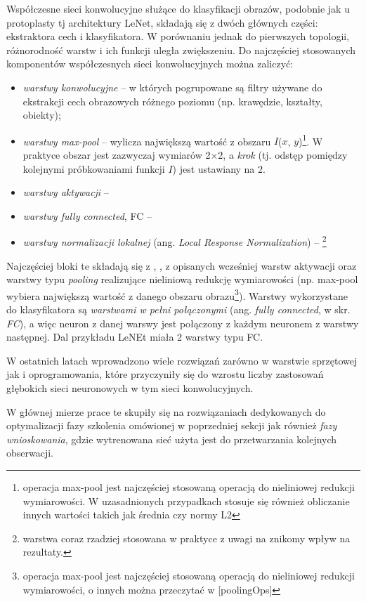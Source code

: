 Współczesne sieci konwolucyjne służące do klasyfikacji obrazów, podobnie jak u protoplasty tj architektury LeNet, składają się z dwóch głównych części: ekstraktora cech i klasyfikatora. W porównaniu jednak do pierwszych topologii, różnorodność warstw i ich funkcji uległa zwiększeniu. Do najczęściej stosowanych komponentów współczesnych sieci konwolucyjnych można zaliczyć:
\begin{itemize}
	\item \textit{warstwy konwolucyjne} -- w których pogrupowane są filtry używane do ekstrakcji cech obrazowych różnego poziomu (np. krawędzie, kształty, obiekty);
	\item \textit{warstwy max-pool} -- wylicza największą wartość z obszaru $I$($x$, $y$)\footnote{operacja max-pool jest najczęściej stosowaną operacją do nieliniowej redukcji wymiarowości. W uzasadnionych przypadkach stosuje się również obliczanie innych wartości takich jak średnia czy normy L2}. W praktyce obszar jest zazwyczaj wymiarów 2$\times$2, a \textit{krok} (tj. odstęp pomiędzy kolejnymi próbkowaniami funkcji $I$) jest ustawiany na 2.
	\item \textit{warstwy aktywacji} --
	\item \textit{warstwy fully connected}, FC --
	\item \textit{warstwy normalizacji lokalnej} (ang. \textit{Local Response Normalization}) -- \footnote{warstwa coraz rzadziej stosowana w praktyce z uwagi na znikomy wpływ na rezultaty.}
\end{itemize}
Najczęściej bloki te składają się z , , z opisanych wcześniej warstw aktywacji oraz warstwy typu \textit{pooling} realizujące nieliniową redukcję wymiarowości (np. max-pool wybiera największą wartość z danego obszaru obrazu\footnote{operacja max-pool jest najczęściej stosowaną operacją do nieliniowej redukcji wymiarowości, o innych można przeczytać w [poolingOps]}). Warstwy wykorzystane do klasyfikatora są \textit{warstwami w pełni połączonymi} (ang. \textit{fully connected}, w skr. \textit{FC}), a więc neuron z danej warswy jest połączony z każdym neuronem z warstwy następnej. Dal przykładu LeNEt miała 2 warstwy typu FC.


W ostatnich latach wprowadzono wiele rozwiązań zarówno w warstwie sprzętowej jak i oprogramowania, które przyczyniły się do wzrostu liczby zastosowań głębokich sieci neuronowych w tym sieci konwolucyjnych. 

W głównej mierze prace te skupiły się na rozwiązaniach dedykowanych do optymalizacji fazy szkolenia omówionej w poprzedniej sekcji jak również \textit{fazy wnioskowania}, gdzie wytrenowana sieć użyta jest do przetwarzania kolejnych obserwacji.


